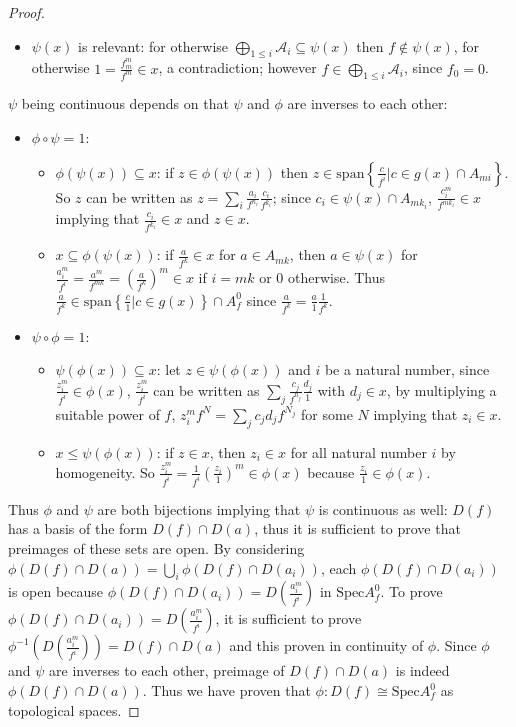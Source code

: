 \documentclass[a4paper,UKenglish,cleveref, autoref, thm-restate]{lipics-v2021}
\begin{document}
\begin{proof}
\begin{itemize}
        \item  $\psi(x)$ is relevant: for otherwise $\bigoplus_{1\le i}\mathcal{A}_i\subseteq \psi(x)$ then $f\not\in \psi(x)$, for otherwise $1=\frac{f_m^m}{f^m}\in x$, a contradiction; however $f\in\bigoplus_{1\le i}\mathcal{A}_i$, since $f_0=0$.
    \end{itemize}
    $\psi$ being continuous depends on that $\psi$ and $\phi$ are inverses to each other:
    \begin{itemize}
        \item $\phi\circ \psi=1$:
        \begin{itemize}
            \item $\phi(\psi(x))\subseteq x$: if $z\in \phi(\psi(x))$ then $z\in\mathrm{span}\left\{\frac c{f^i}|c\in g(x)\cap A_{mi}\right\}$. So $z$ can be written as
            $z=\sum_i \frac{a_i}{f^{n_i}}\frac{c_i}{f^{k_i}}$;
            since $c_i\in \psi(x)\cap A_{mk_i}$, $\frac{c_i^m}{f^{mk_i}}\in x$ implying that $\frac{c_i}{f^{k_i}}\in x$ and $z \in x$.
            \item $x\subseteq \phi(\psi(x))$: if $\frac{a}{f^k} \in x$ for $a\in A_{mk}$, then $a\in \psi(x)$ for $\frac{a_i^m}{f^i}=\frac{a^m}{f^{mk}}=\left(\frac{a}{f^k}\right)^m\in x$ if $i=mk$ or $0$ otherwise. Thus $\frac{a}{f^k}\in\mathrm{span}\left\{\frac c1|c \in g(x)\right\}\cap A^0_f$ since $\frac{a}{f^k}=\frac a 1\frac1{f^k}$.
        \end{itemize}
        \item $\psi\circ \phi=1$:
        \begin{itemize}
            \item $\psi(\phi(x))\subseteq x$: let $z\in \psi(\phi(x))$ and $i$ be a natural number, since $\frac{z_i^m}{f^i}\in \phi(x)$, $\frac{z_i^m}{f^i}$ can be written as $\sum_j\frac{c_j}{f^{n_j}}\frac{d_j}1$
            with $d_j\in x$, by multiplying a suitable power of $f$,
            $z_i^mf^N=\sum_jc_jd_jf^{N_j}$ for some $N$ implying that $z_i\in x$.
            \item $x\le \psi(\phi(x))$: if $z\in x$, then $z_i\in x$ for all natural number $i$ by homogeneity. So $\frac{z_i^m}{f^i}=\frac1{f^i}\left(\frac{z_i}1\right)^m\in \phi(x)$ because $\frac{z_i}1\in \phi(x)$.
        \end{itemize}
    \end{itemize}
    Thus $\phi$ and $\psi$ are both bijections implying that $\psi$ is continuous as well: ${D(f)}$ has a basis of the form $D(f)\cap D(a)$, thus it is sufficient to prove that preimages of these sets are open. By considering $\phi(D(f)\cap D(a))=\bigcup_i \phi(D(f)\cap D(a_i))$, each $\phi(D(f)\cap D(a_i))$ is open because $\phi(D(f)\cap D(a_i))=D\left(\frac{a_i^m}{f^i}\right)$ in $\mathrm{Spec} A^0_f$. To prove $\phi(D(f)\cap D(a_i))=D\left(\frac{a_i^m}{f^i}\right)$, it is sufficient to prove $\phi^{-1}(D\left(\frac{a_i^m}{f^i}\right))=D(f)\cap D(a)$ and this proven in continuity of $\phi$. Since $\phi$ and $\psi$ are inverses to each other, preimage of $D(f)\cap D(a)$ is indeed $\phi(D(f)\cap D(a))$.
    Thus we have proven that $\phi: D(f)\cong \mathrm{Spec} A^0_f$ as topological spaces.
\end{proof}
\end{document}
